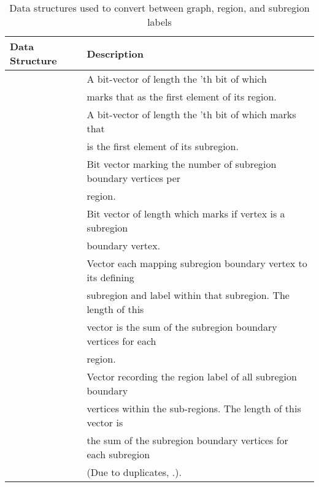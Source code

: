 \begin{table}[H]
\centering
\begin{tabular}{l | l}
  Data Structure & Description \\ \hline
   & A bit-vector of length  the 'th bit of which \\
              & marks that  as the first element of its region. \\
   & A bit-vector of length  the 'th bit of which marks that\\
              &   is the first element of its subregion. \\
   & Bit vector marking the number of subregion boundary vertices per \\
              & region. \\
   & Bit vector of length  which marks if vertex  is a subregion \\
              &  boundary vertex. \\
   & Vector each mapping subregion boundary vertex to its defining \\
              & subregion and label within that subregion. The length of this\\
			  & vector is the sum of the subregion boundary vertices for each \\
			  & region. \\
   & Vector recording the region label of all subregion boundary \\
			  & vertices within the sub-regions. The length of this vector is \\
			  & the sum of the subregion boundary vertices for each subregion \\
			  & (Due to duplicates, .). \\ \hline
\end{tabular}
\caption{Data structures used to convert between graph, region, and subregion labels}
\label{tab:ds_label_conv}
\end{table}

